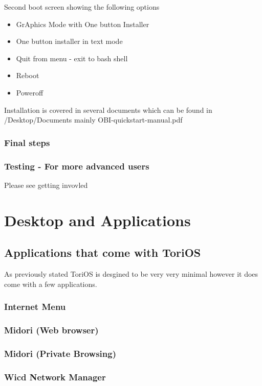 \documentclass[12pt,a4paper]{book}
\begin{document}
Second boot screen showing the following options \\

\begin{itemize}
\item{GrAphics Mode with One button Installer}
\item {One button installer in text mode}
\item{Quit from menu - exit to bash shell}
\item{Reboot}
\item{Poweroff}
\end{itemize}


Installation is covered in several documents which can be found in /Desktop/Documents
mainly 
OBI-quickstart-manual.pdf



\subsection{Final steps}

\subsection{Testing - For more advanced users}

Please see getting invovled

 
\chapter{Desktop and Applications}

\section{Applications that come with ToriOS}
As previously stated ToriOS is desgined to be very very minimal however it does come with a few applications. 
\subsection{Internet Menu}
\subsection{Midori (Web browser)}
\subsection{Midori (Private Browsing)}
\subsection{Wicd Network Manager}
\end{document}

